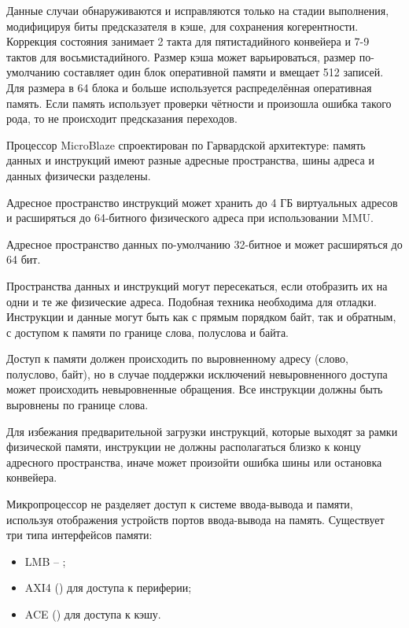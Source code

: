 Данные случаи обнаруживаются и исправляются только на стадии выполнения,
модифицируя биты предсказателя в кэше, для сохранения когерентности.
Коррекция состояния занимает 2 такта для пятистадийного конвейера и 7-9 тактов
для восьмистадийного. Размер кэша может варьироваться, размер по-умолчанию
составляет один блок оперативной памяти и вмещает 512 записей.
Для размера в 64 блока и больше используется распределённая оперативная
память. Если память использует проверки чётности и произошла ошибка такого рода,
то не происходит предсказания переходов.

Процессор MicroBlaze спроектирован по Гарвардской архитектуре: память данных и инструкций
имеют разные адресные пространства, шины адреса и данных физически разделены.

Адресное пространство инструкций может хранить до 4 ГБ виртуальных адресов и
расширяться до 64-битного физического адреса при использовании MMU.

Адресное пространство данных по-умолчанию 32-битное и может расширяться до 64 бит.

Пространства данных и инструкций могут пересекаться, если отобразить их на одни и те же
физические адреса. Подобная техника необходима для отладки. Инструкции и данные могут быть
как с прямым порядком байт, так и обратным, с доступом к памяти по границе слова, полуслова и байта.

Доступ к памяти должен происходить по выровненному адресу (слово, полуслово, байт), но в случае
поддержки исключений невыровненного доступа может происходить невыровненные обращения. Все инструкции
должны быть выровнены по границе слова.

Для избежания предварительной загрузки инструкций, которые выходят за рамки физической памяти, инструкции
не должны располагаться близко к концу адресного пространства, иначе может произойти ошибка шины или
остановка конвейера.

Микропроцессор не разделяет доступ к системе ввода-вывода и памяти, используя отображения
устройств портов ввода-вывода на память. Существует три типа интерфейсов памяти:
\begin{itemize}
   \item LMB -- ;
   \item AXI4 () для доступа к периферии;
   \item ACE () для доступа к кэшу.
\end{itemize}

